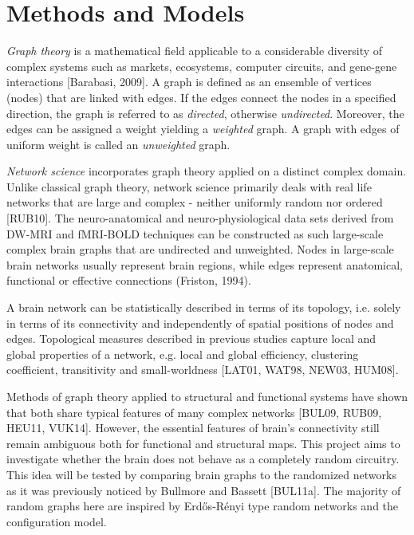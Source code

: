 
\chapter{Methods and Models} %

\label{Chapter2} %




\textit{Graph theory} is a mathematical field applicable to a considerable diversity of complex systems such as markets, ecosystems, computer circuits, and gene-gene interactions [Barabasi, 2009]. A graph is defined as an ensemble of vertices (nodes) that are linked with edges. If the edges connect the nodes in a specified direction, the graph is referred to as \textit{directed}, otherwise \textit{undirected}. Moreover, the edges can be assigned a weight yielding a \textit{weighted} graph. A graph with edges of uniform weight is called an \textit{unweighted} graph.

\textit{Network science} incorporates graph theory applied on a   
distinct complex domain. Unlike classical graph theory, network science primarily deals with real life networks that are large and complex - neither uniformly random nor ordered [RUB10]. The neuro-anatomical and neuro-physiological data sets derived from  DW-MRI and fMRI-BOLD techniques can be constructed as such large-scale complex brain graphs that are undirected and unweighted. Nodes in large-scale brain networks usually represent brain regions, while edges represent anatomical, functional or effective connections (Friston, 1994). 


A brain network can be statistically described in terms of its topology, i.e. solely in terms of its connectivity and independently of spatial positions of nodes and edges. Topological measures described in previous studies capture local and global properties of a network, e.g. local and global efficiency, clustering coefficient, transitivity and small-worldness [LAT01, WAT98, NEW03, HUM08].


Methods of graph theory applied to structural and functional systems have shown that both share typical features of many complex networks [BUL09, RUB09, HEU11, VUK14]. However, the essential features of brain's connectivity still remain ambiguous both for functional and structural maps. This project aims to investigate whether the brain does not behave as a completely random circuitry. This idea will be tested by comparing brain graphs to the randomized networks as it was previously noticed by Bullmore and Bassett [BUL11a]. The majority of random graphs here are inspired by  Erd\H{o}s-R\'{e}nyi type random networks and the configuration model. 
 

